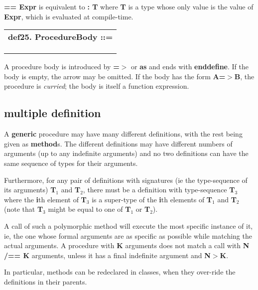 \documentclass{report}
\begin{document}
{\bf == Expr} is equivalent to {\bf : T} where {\bf T} is a type whose only value is the
value of {\bf Expr}, which is evaluated at compile-time.

\begin{tabular}{l}
{\bf def25. ProcedureBody ::= }\\ 
\hspace*{3mm}{\tt StatementSeq} \\ 
\hspace*{3mm}{\tt  $\mid$ ArgList "=$>$" ProcedureBody} \\ 
\hspace*{3mm}{\tt  $\mid$ Arg "=$>$" ProcedureBody} \\ 
\end{tabular}



A procedure body is introduced by {\bf =$>$} or {\bf as} and ends with {\bf enddefine}. If
the body is empty, the arrow may be omitted. If the body has the form {\bf A=$>$B},
the procedure is {\em curried}; the body is itself a function expression.

\subsection{multiple definition}


A {\bf generic} procedure may have many different definitions, with the rest being
given as {\bf method}s. The different definitions may have different numbers of
arguments (up to any indefinite arguments) and no two definitions can have the
same sequence of types for their arguments.

Furthermore, for any pair of definitions with signatures (ie the
type-sequence of its arguments) {\bf T$_ 1$} and {\bf T$_ 2$}, there must be a
definition with type-sequence {\bf T$_ 3$} where the {\bf i}th element of {\bf T$_ 3$}
is a super-type of the {\bf i}th elements of {\bf T$_ 1$} and {\bf T$_ 2$} (note that
{\bf T$_ 3$} might be equal to one of {\bf T$_ 1$} or {\bf T$_ 2$}).

A call of such a polymorphic method will execute the most specific instance of
it, ie, the one whose formal arguments are as specific as possible while
matching the actual arguments. A procedure with {\bf K} arguments does not match a
call with {\bf N /== K} arguments, unless it has a final indefinite argument and
{\bf N$>$K}.

In particular, methods can be redeclared in classes, when
they over-ride the definitions in their parents.
\end{document}
